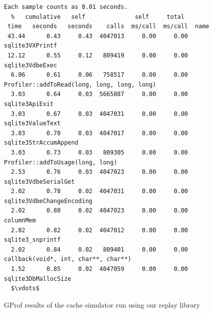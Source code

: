 \begin{figure}
  \lstset{basicstyle=\footnotesize, mathescape=true}
  \begin{lstlisting}
Each sample counts as 0.01 seconds.
  %   cumulative   self              self     total           
 time   seconds   seconds    calls  ms/call  ms/call  name    
 43.44      0.43     0.43  4047013     0.00     0.00  sqlite3VXPrintf
 12.12      0.55     0.12   809419     0.00     0.00  sqlite3VdbeExec
  6.06      0.61     0.06   758517     0.00     0.00  Profiler::addToRead(long, long, long, long)
  3.03      0.64     0.03  5665887     0.00     0.00  sqlite3ApiExit
  3.03      0.67     0.03  4047031     0.00     0.00  sqlite3ValueText
  3.03      0.70     0.03  4047017     0.00     0.00  sqlite3StrAccumAppend
  3.03      0.73     0.03   809305     0.00     0.00  Profiler::addToUsage(long, long)
  2.53      0.76     0.03  4047023     0.00     0.00  sqlite3VdbeSerialGet
  2.02      0.78     0.02  4047031     0.00     0.00  sqlite3VdbeChangeEncoding
  2.02      0.80     0.02  4047023     0.00     0.00  columnMem
  2.02      0.82     0.02  4047012     0.00     0.00  sqlite3_snprintf
  2.02      0.84     0.02   809401     0.00     0.00  callback(void*, int, char**, char**)
  1.52      0.85     0.02  4047059     0.00     0.00  sqlite3DbMallocSize
  $\vdots$
  \end{lstlisting}
  \caption{GProf results of the cache simulator run using our replay library}
  \label{fig:profiler}
\end{figure}
